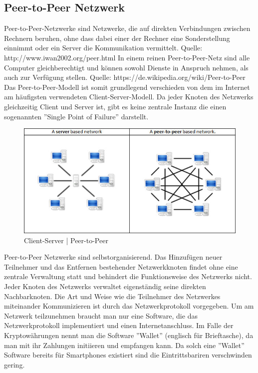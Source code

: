 \subsection{Peer-to-Peer Netzwerk}
Peer-to-Peer-Netzwerke sind Netzwerke, die auf direkten Verbindungen zwischen Rechnern beruhen, ohne dass dabei einer der Rechner eine Sonderstellung einnimmt oder ein Server die Kommunikation vermittelt. Quelle: http://www.iwan2002.org/peer.html
In einem reinen Peer-to-Peer-Netz sind alle Computer gleichberechtigt und können sowohl Dienste in Anspruch nehmen, als auch zur Verfügung stellen.
Quelle: https://de.wikipedia.org/wiki/Peer-to-Peer
Das Peer-to-Peer-Modell ist somit grundlegend verschieden von dem im Internet am häufigsten verwendeten Client-Server-Modell. Da jeder Knoten des Netzwerks gleichzeitig Client und Server ist, gibt es keine zentrale Instanz die einen sogenannten ''Single Point of Failure'' darstellt. 

\begin{figure}
\centering
\includegraphics[width=1\linewidth]{Figures/p2p_networks}
\decoRule
\caption{Client-Server | Peer-to-Peer}
\label{fig:p2p_networks}
\end{figure}

Peer-to-Peer Netzwerke sind selbstorganisierend. Das Hinzufügen neuer Teilnehmer und das Entfernen bestehender Netzwerkknoten findet ohne eine zentrale Verwaltung statt und behindert die Funktionsweise des Netzwerks nicht. Jeder Knoten des Netzwerks verwaltet eigenständig seine direkten Nachbarknoten.
Die Art und Weise wie die Teilnehmer des Netzwerkes miteinander Kommunizieren ist durch das Netzwerkprotokoll vorgegeben. Um am Netzwerk teilzunehmen braucht man nur eine Software, die das Netzwerkprotokoll implementiert und einen Internetanschluss.
Im Falle der Kryptowährungen nennt man die Software ''Wallet'' (englisch für Brieftasche), da man mit ihr Zahlungen initiieren und empfangen kann.
Da solch eine ''Wallet'' Software bereits für Smartphones existiert sind die Eintrittsbariren verschwinden gering.

